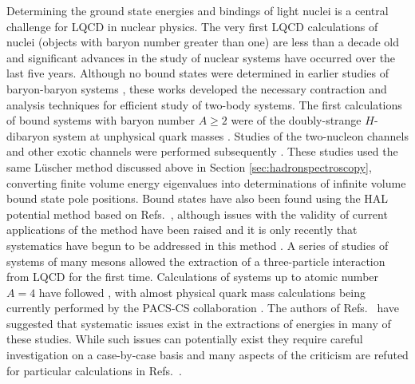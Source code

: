 Determining the ground state energies and bindings of light nuclei is a central challenge for LQCD in nuclear physics. The very first LQCD calculations of nuclei (objects with baryon number greater than one) are less than a decade old and significant advances in the study of nuclear systems have occurred over the last five years. Although no bound states were determined in earlier studies of baryon-baryon systems \cite{Yamazaki:2009ua,Beane:2006gf,Beane:2006mx,Beane:2009gs,Beane:2009kya}, these works  developed the necessary contraction and analysis techniques for efficient study of two-body systems. 
The first calculations of bound systems with baryon number $A\ge2$ were of the doubly-strange $H$-dibaryon system at unphysical quark masses \cite{Beane:2010hg,Inoue:2010es,Beane:2011xf}. 
Studies of the two-nucleon channels \cite{Beane:2011iw} and other exotic channels were performed subsequently \cite{Berkowitz:2015eaa,Francis:2018qch,Wagman:2017tmp}. These studies used the same L\"uscher method discussed above in Section \ref{sec:hadronspectroscopy}, converting finite volume energy eigenvalues into determinations of infinite volume bound state pole positions. Bound states have also been found using the HAL potential method \cite{Ishii:2006ec} based on Refs.~\cite{Luscher:1986pf,Lin:2001ek}, although issues with the validity of current applications of the method have been raised  \cite{Detmold:2007wk,Birse:2012ph,Yamazaki:2018qut,Yamazaki:2017gjl,Namekawa:2017sxs} and it is only recently that systematics have begun to be addressed in this method \cite{Kawai:2017goq}.
A series of studies of systems of many mesons \cite{Beane:2007es,Detmold:2008yn,Detmold:2011kw} allowed the extraction of a three-particle interaction from LQCD for the first time.
Calculations of systems up to atomic number $A=4$  have followed \cite{Beane:2012vq,Yamazaki:2012hi,Yamazaki:2015asa}, with almost physical quark mass calculations being currently performed by the PACS-CS collaboration \cite{Yamazaki:2015asa}. The authors of Refs.~\cite{Iritani:2018zbt} have suggested that systematic issues exist in the extractions of energies in many of these studies. While such issues can potentially exist they require careful investigation on a case-by-case basis and many aspects of the criticism are refuted for particular calculations in Refs.~\cite{Beane:2017edf,Namekawa:2017sxs,Yamazaki:2017jfh}.

